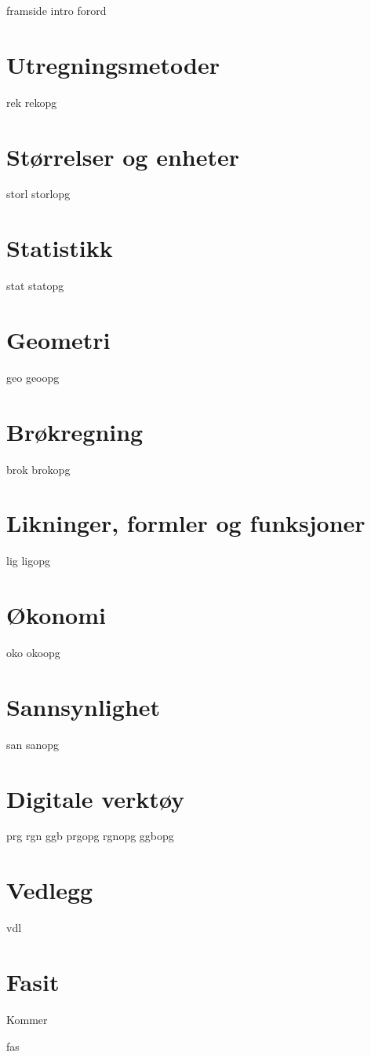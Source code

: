 




{framside}
{intro}
{forord}

\tableofcontents
\chapter{Utregningsmetoder}
\newpage
{rek}
{rekopg}

\chapter{Størrelser og enheter}
\newpage
{storl}
\opgt
{storlopg}

\chapter{Statistikk}
\newpage
{stat}
{statopg}

\chapter{Geometri}
\newpage
{geo}
{geoopg}

\chapter{Brøkregning \label{Br}}
\newpage
{brok}
\newpage
{brokopg}

\chapter{Likninger, formler og funksjoner \label{Lig}}
\newpage
{lig}
{ligopg}

\chapter{Økonomi \label{Oko}}
\newpage
{oko}
{okoopg}

\chapter{Sannsynlighet \label{San}} 
\newpage
{san}
{sanopg}

\chapter{Digitale verktøy}
\newpage
{prg}
{rgn}	
{ggb}	
\opgt
{prgopg}
{rgnopg}	
{ggbopg}	

\chapter*{Vedlegg} 
\newpage
{}
{vdl}


\chapter*{Fasit}
Kommer

{fas}






